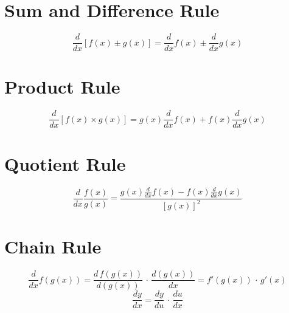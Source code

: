 \documentclass[12pt]{article}
\begin{document}
\newpage
\section{Sum and Difference Rule}
$$\displaystyle\frac{d}{dx}[f(x)\pm g(x)] = \frac{d}{dx}f(x) \pm \frac{d}{dx}g(x)$$
\section{Product Rule}
$$\displaystyle\frac{d}{dx}[f(x)\times g(x)] = g(x)\frac{d}{dx}f(x) + f(x)\frac{d}{dx}g(x)$$
\section{Quotient Rule}
$$\displaystyle\frac{d}{dx}\frac{f(x)}{g(x)} = \frac{g(x)\frac{d}{dx}f(x) - f(x)\frac{d}{dx}g(x)}{[g(x)]^2}$$
\section{Chain Rule}
$$\displaystyle\frac{d}{dx}f(g(x)) = \frac{d\,f(g(x))}{d(g(x))}\,\cdot\,\frac{d(g(x))}{dx} = f'(g(x))\,\cdot\, g'(x)$$
$$\displaystyle\frac{dy}{dx} = \frac{dy}{du}\,\cdot\,\frac{du}{dx} $$
\end{document}
